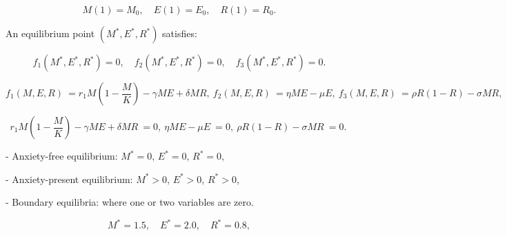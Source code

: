 \documentclass[10pt]{NSP1}
\begin{document}
\[
M(1) = M_{0},\quad E(1) = E_{0},\quad R(1) = R_{0}.
\]

\par\medskip{}\smallskip

An equilibrium point \(\left( M^{*},E^{*},R^{*} \right)\) satisfies:

\[
f_{1}\left( M^{*},E^{*},R^{*} \right) = 0,\quad f_{2}\left( M^{*},E^{*},R^{*} \right) = 0,\quad f_{3}\left( M^{*},E^{*},R^{*} \right) = 0.
\]

\par\vspace{9.0pt}\vspace{9.0pt}

\[
f_{1}(M,E,R)\ = r_{1}M\left( 1 - \frac{M}{K} \right) - \gamma ME + \delta MR,\ f_{2}(M,E,R)\ = \eta ME - \mu E,\ f_{3}(M,E,R)\ = \rho R(1 - R) - \sigma MR,\
\]

\par\vspace{9.0pt}\vspace{9.0pt}

\[
r_{1}M\left( 1 - \frac{M}{K} \right) - \gamma ME + \delta MR\ = 0,\ \eta ME - \mu E\ = 0,\ \rho R(1 - R) - \sigma MR\ = 0.\
\]

\par\vspace{9.0pt}\vspace{9.0pt}

- Anxiety-free equilibrium: \(M^{*} = 0\), \(E^{*} = 0\), \(R^{*} = 0\),

- Anxiety-present equilibrium: \(M^{*} > 0\), \(E^{*} > 0\), \(R^{*} > 0\),

- Boundary equilibria: where one or two variables are zero.

\par\vspace{9.0pt}\vspace{9.0pt}

\[
M^{*} = 1.5,\quad E^{*} = 2.0,\quad R^{*} = 0.8,
\]

\par\vspace{9.0pt}\vspace{9.0pt}
\end{document}
